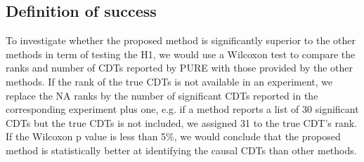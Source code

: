 %


\subsection{Definition of success}
To investigate whether the proposed method  is significantly superior to the other methods in term of testing the H1, we would use a Wilcoxon test to compare the ranks and number of CDTs reported by PURE with those provided by the  other methods. 
If the rank of the true CDTs is not available in an experiment, we replace the NA ranks by the number of significant CDTs reported in the corresponding experiment plus one, 
e.g. if a method reports a list of 30 significant CDTs but the true CDTs is not included, we assigned 31 to the true CDT's rank.
If the Wilcoxon p value is less than 5\%, we would conclude that the proposed method is statistically better at identifying the causal CDTs than other methods.

